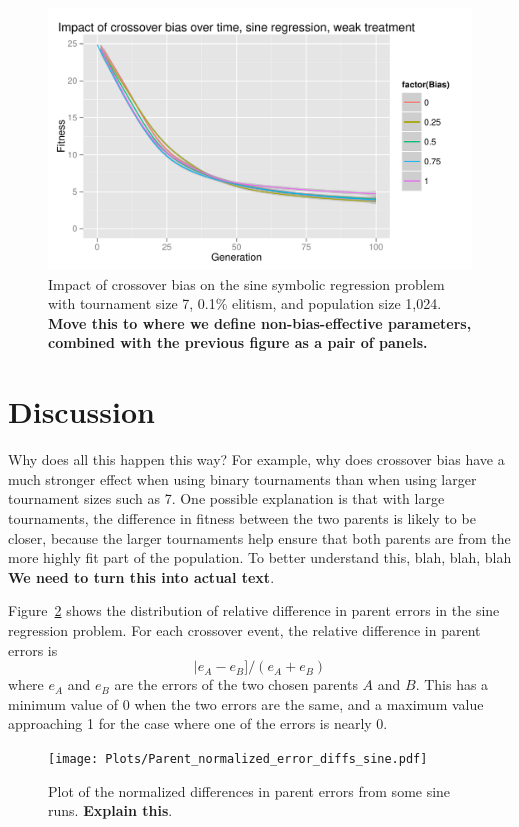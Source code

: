 \documentclass{sig-alternate}
\begin{document}
\begin{figure}
\centering
\includegraphics[width=0.45 \textwidth]{Plots/Sine_XO_fitness_vs_gen_weak.pdf}
\caption{Impact of crossover bias on the sine symbolic regression problem with tournament size 7, 0.1\% elitism, and 
population size 1,024.  \textbf{Move this to where we define non-bias-effective parameters, combined with the previous figure as a pair of panels.}}
\label{fig:sineBiasFitnessVsGenWeak}
\end{figure}

\section{Discussion} \label{sec:Discussion}

Why does all this happen this way? For example, why does crossover bias have a much stronger effect when using binary
tournaments than when using larger tournament sizes such as 7. One possible explanation is that with large tournaments,
the difference in fitness between the two parents is likely to be closer, because the larger tournaments help ensure
that both parents are from the more highly fit part of the population. To better understand this, blah, blah, blah
\textbf{We need to turn this into actual text}.

Figure~\ref{fig:parentDiffsSine} shows the distribution of relative difference in parent errors in the sine regression 
problem. For each crossover event, the relative difference in parent errors is
\[
	|e_A - e_B] / (e_A + e_B)
\]
where $e_A$ and $e_B$ are the errors of the two chosen parents $A$ and $B$. This has a minimum value of 0 when 
the two errors are the same, and a maximum value approaching 1 for the case where one of the errors is nearly 0.

\begin{figure}
\centering
\texttt{[image: Plots/Parent\_normalized\_error\_diffs\_sine.pdf]}
\caption{Plot of the normalized differences in parent errors from some sine runs. \textbf{Explain this}.}
\label{fig:parentDiffsSine}
\end{figure}
\end{document}
